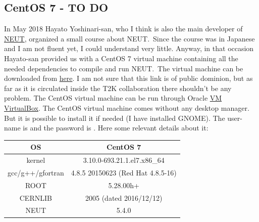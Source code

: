 \subsection{CentOS 7 - TO DO}
In May 2018 Hayato Yoshinari-san, who I think is also the main
developer of \href{https://inspirehep.net/record/844435?ln=en}{NEUT},
organized a small course about NEUT.\ Since the course was in Japanese
and I am not fluent yet, I could understand very little. Anyway, in
that occasion Hayato-san provided us with a CentOS 7 virtual machine
containing all the needed dependencies to compile and run NEUT.\ The
virtual machine can be downloaded from
\href{https://tinyurl.com/y8hy9kyr}{here}. I am not sure that this
link is of public dominion, but as far as it is circulated inside the
T2K collaboration there shouldn't be any problem.  The CentOS
virtual machine can be run through Oracle
\href{http://www.oracle.com/technetwork/server-storage/%
  virtualbox/downloads/index.html}{VM VirtualBox}.  The CentOS virtual
machine comes without any desktop manager. But it is possible to
install it if needed (I have installed GNOME). The user-name is
 and the password is . Here
some relevant details about it:
\begin{center}
  \begin{tabular}{||c | c||} %
    \hline %
    OS & CentOS 7 \\ [0.5ex] 
    \hline\hline %
    kernel & 3.10.0-693.21.1.el7.x86\_64 \\
    \hline %
    gcc/g++/gfortran & 4.8.5 20150623 (Red Hat 4.8.5-16) \\ 
    \hline %
    ROOT & 5.28.00h+\\
    \hline %
    CERNLIB & 2005 (dated 2016/12/12) \\
    \hline %
    NEUT & 5.4.0 \\ [1ex] 
    \hline
  \end{tabular}
\end{center}

